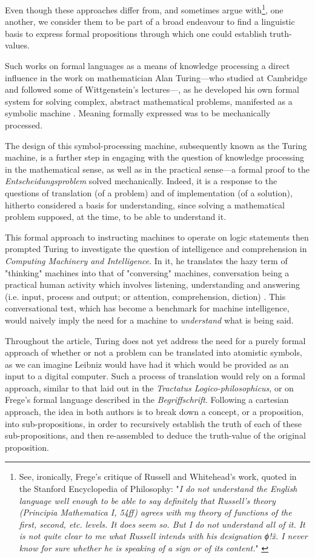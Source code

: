 Even though these approaches differ from, and sometimes argue with\footnote{See, ironically, Frege's critique of Russell and Whitehead's work, quoted in the Stanford Encyclopedia of Philosophy: "\emph{I do not understand the English language well enough to be able to say definitely that Russell's theory (Principia Mathematica I, 54ff) agrees with my theory of functions of the first, second, etc. levels. It does seem so. But I do not understand all of it. It is not quite clear to me what Russell intends with his designation ϕ!\^x. I never know for sure whether he is speaking of a sign or of its content.}" \citep{linsky_principia_2022}}, one another, we consider them to be part of a broad endeavour to find a linguistic basis to express formal propositions through which one could establish truth-values.

Such works on formal languages as a means of knowledge processing a direct influence in the work on mathematician Alan Turing—who studied at Cambridge and followed some of Wittgenstein's lectures—, as he developed his own formal system for solving complex, abstract mathematical problems, manifested as a symbolic machine \citep{turing_computable_1936}. Meaning formally expressed was to be mechanically processed.

The design of this symbol-processing machine, subsequently known as the Turing machine, is a further step in engaging with the question of knowledge processing in the mathematical sense, as well as in the practical sense—a formal proof to the \emph{Entscheidungsproblem} solved mechanically. Indeed, it is a response to the questions of translation (of a problem) and of implementation (of a solution), hitherto considered a basis for understanding, since solving a mathematical problem supposed, at the time, to be able to understand it.

This formal approach to instructing machines to operate on logic statements then prompted Turing to investigate the question of intelligence and comprehension in \emph{Computing Machinery and Intelligence}. In it, he translates the hazy term of "thinking" machines into that of "conversing" machines, conversation being a practical human activity which involves listening, understanding and answering (i.e. input, process and output; or attention, comprehension, diction) \citep{turing_computing_2009}. This conversational test, which has become a benchmark for machine intelligence, would naively imply the need for a machine to \emph{understand} what is being said.

Throughout the article, Turing does not yet address the need for a purely formal approach of whether or not a problem can be translated into atomistic symbols, as we can imagine Leibniz would have had it which would be provided as an input to a digital computer. Such a process of translation would rely on a formal approach, similar to that laid out in the \emph{Tractatus Logico-philosophicus}, or on Frege's formal language described in the \emph{Begriffschrift}. Following a cartesian approach, the idea in both authors is to break down a concept, or a proposition, into sub-propositions, in order to recursively establish the truth of each of these sub-propositions, and then re-assembled to deduce the truth-value of the original proposition.

